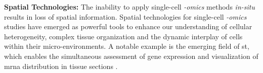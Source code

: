 \textbf{Spatial Technologies: } %
The inability to apply single-cell \textit{-omics} methods \textit{in-situ} results in loss of spatial information. Spatial technologies for single-cell \textit{-omics} studies have emerged as powerful tools to enhance our understanding of cellular heterogeneity, complex tissue organization and the dynamic interplay of cells within their micro-environments. A notable example is the emerging field of \gls{st}, which enables the simultaneous assessment of gene expression and visualization of \gls{mrna} distribution in tissue sections \textbf{\cite{moses_museum_2022,tian_expanding_2023}}.\\ %








